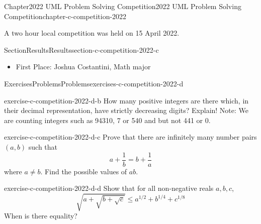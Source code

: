 \documentclass[oneside,10pt,]{book}
\numberwithin{equation}{section}
\begin{document}
%
%
\typeout{************************************************}
\typeout{************************************************}
%
\begin{chapterptx}{Chapter}{2022 UML Problem Solving Competition}{}{2022 UML Problem Solving Competition}{}{}{chapter-c-competition-2022}
\renewcommand*{\chaptername}{Chapter}
\begin{introduction}{}%
A two hour local competition was held on 15 April 2022.%
\end{introduction}%
%
%
\typeout{************************************************}
\typeout{************************************************}
%
\begin{sectionptx}{Section}{Results}{}{Results}{}{}{section-c-competition-2022-c}
%
\begin{itemize}[label=\textbullet]
\item{}First Place:  Joshua Costantini, Math major%
\end{itemize}
%
\end{sectionptx}
%
%
\typeout{************************************************}
\typeout{************************************************}
%
\begin{exercises-section}{Exercises}{Problems}{}{Problems}{}{}{exercises-c-competition-2022-d}
\begin{divisionexercise}{1}{}{}{exercise-c-competition-2022-d-b}%
How many positive integers are there which, in their decimal representation, have strictly decreasing digits? Explain!  Note:  We are counting integers such as  94310, 7 or 540 and but not 441 or 0.%
\end{divisionexercise}%
\begin{divisionexercise}{2}{}{}{exercise-c-competition-2022-d-c}%
Prove that there are infinitely many number pairs \((a,b)\) such that%
\begin{equation*}
a+\frac{1}{b}=b+\frac{1}{a}
\end{equation*}
where \(a\neq b\). Find the possible values of \(a b\).%
\end{divisionexercise}%
\begin{divisionexercise}{3}{}{}{exercise-c-competition-2022-d-d}%
Show that for all non-negative reals \(a, b, c\),%
\begin{equation*}
\sqrt{a + \sqrt{b + \sqrt{c}}} \leq a^{1/2}+ b^{1/4} + c^{1/8}
\end{equation*}
When is there equality?%

\end{divisionexercise}
\end{exercises-section}
\end{chapterptx}
\end{document}
